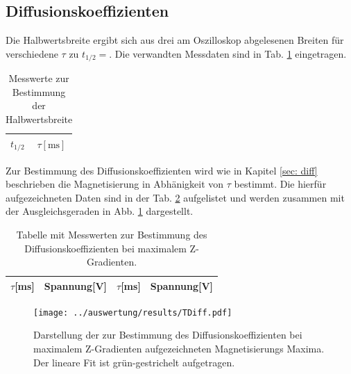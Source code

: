 \subsection{Diffusionskoeffizienten}
\label{Kap:Dif_koef}

Die Halbwertsbreite ergibt sich aus drei am Oszilloskop abgelesenen Breiten für verschiedene $\tau$ zu $t_{1/2}=$.
Die verwandten Messdaten sind in Tab. \ref{Tab: Halfw} eingetragen.

\begin{table}[H]
	\begin{center}
		\begin{tabular}{l|c}
			$t_{1/2}$ & $\tau[\si{\milli\second}]$\\ \hline
						
		\end{tabular}
	\end{center}
	\caption{Messwerte zur Bestimmung der Halbwertsbreite}
	\label{Tab: Halfw}
\end{table}

Zur Bestimmung des Diffusionskoeffizienten wird wie in Kapitel \ref{sec: diff} beschrieben die Magnetisierung in Abhänigkeit von $\tau$ bestimmt. Die hierfür aufgezeichneten Daten sind in der Tab. \ref{Tab:D} aufgelistet und werden zusammen mit der Ausgleichsgeraden in Abb. \ref{Abb:D} dargestellt.

\begin{table}[H]
	\begin{center}
		\begin{tabular}{l|c||l|c}
			$\tau$[ms] & Spannung[V] & $\tau$[ms] & Spannung[V]\\ \hline
			
		\end{tabular}
	\end{center}
	\caption{Tabelle mit Messwerten zur Bestimmung des Diffusionskoeffizienten bei maximalem Z-Gradienten.}
	\label{Tab:D}
\end{table}

\begin{figure}[H]
	\centering
	\vspace*{-0,4cm}
	\texttt{[image: ../auswertung/results/TDiff.pdf]}
	\caption{Darstellung der zur Bestimmung des Diffusionskoeffizienten bei maximalem Z-Gradienten aufgezeichneten Magnetisierungs Maxima. Der lineare Fit ist grün-gestrichelt aufgetragen.}
	\label{Abb:D}
\end{figure}


